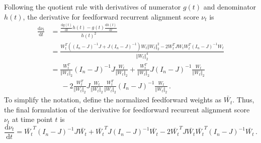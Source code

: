 \documentclass[11pt]{article}
\begin{document}
	Following the quotient rule with derivatives of numerator $g(t)$ and denominator $h(t)$, the derivative for feedforward recurrent alignment score $\nu_t$ is 
		\begin{equation}
			\begin{split}
				\frac{\mathrm{d}\nu_t}{\mathrm{d}t} &= \frac{\frac{\mathrm{d}g(t)}{\mathrm{d}t}h(t) - g(t)\frac{\mathrm{d}h(t)}{\mathrm{d}t}}{h(t)^2} \\
				&= \frac{W_t^T \left( (I_n - J)^{-1}J + J(I_n - J)^{-1}\right)W_t \Vert W_t \Vert_2^2 - 2W_t^TJW_tW_t^T (I_n - J)^{-1} W_t }{\Vert W_t \Vert_2^4} \\
				&= \frac{W_t^T}{\Vert W_t \Vert_2} (I_n-J)^{-1} J \frac{W_t}{\Vert W_t \Vert_2} + \frac{W_t^T}{\Vert W_t \Vert_2} J (I_n-J)^{-1} \frac{W_t}{\Vert W_t \Vert_2} \\
				&\, \, \, \, \, \, \, \, \, -2 \frac{W_t^T}{\Vert W_t \Vert_2} J \frac{W_t}{\Vert W_t \Vert_2} \frac{W_t^T}{\Vert W_t \Vert_2} (I_n-J)^{-1} \frac{W_t}{\Vert W_t \Vert_2}  \, .
			\end{split}
		\end{equation}
	To simplify the notation, define the normalized feedforward weights as $\bar{W_t}$. Thus, the final formulation of the derivative for feedforward recurrent alignment score $\nu_t$ at time point $t$ is
		\begin{equation} \label{eq:derivative_ffrec}
			\frac{\mathrm{d}\nu_t}{\mathrm{d}t} = \bar{W_t}^T (I_n-J)^{-1}J\bar{W_t} + \bar{W_t}^T J(I_n -J)^{-1} \bar{W_t} - 2\bar{W_t}^TJ\bar{W_t}\bar{W_t}^T(I_n-J)^{-1}\bar{W_t} \, .
		\end{equation}
	
	
	
\end{document}
